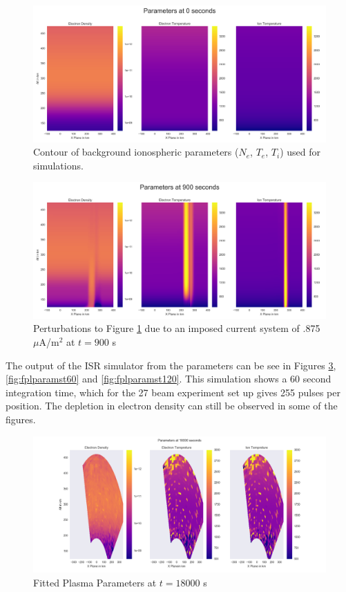 \documentclass[draft,ras]{agutex}
\begin{document}
\begin{article}
\begin{figure}[!t]
\centering
\includegraphics[width=5in]{000_inputdata}
\caption{Contour of background ionospheric parameters ($N_e$, $T_e$, $T_i$) used for simulations.}
\label{fig:plparamst0}
\end{figure}

\begin{figure}[!t]
\centering
\includegraphics[width=5in]{060_inputdata}
\caption{Perturbations to Figure \ref{fig:plparamst0} due to an imposed current system of .875 $\mu$A/m$^2$ at $t=900$ s}
\label{fig:plparamst60}
\end{figure}


The output of the ISR simulator from the parameters can be see in Figures \ref{fig:fplparamst0}, \ref{fig:fplparamst60} and \ref{fig:fplparamst120}. This simulation shows a 60 second integration time, which for the 27 beam experiment set up gives 255 pulses per position. The depletion in electron density can still be observed in some of the figures.

\begin{figure}[!t]
\centering
\includegraphics[width=5in]{000_fitteddata_keep}
\caption{Fitted Plasma Parameters at $t=18000$ s}
\label{fig:fplparamst0}
\end{figure}


\end{article}
\end{document}
